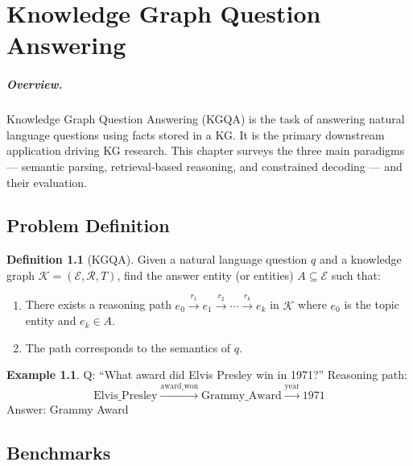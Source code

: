\documentclass[11pt,a4paper,oneside,openany]{book}
\theoremstyle{definition}
\newtheorem{definition}{Definition}[chapter]
\newtheorem{example}{Example}[chapter]
\theoremstyle{plain}
\theoremstyle{remark}
\newcommand{\cE}{\mathcal{E}}
\newcommand{\cR}{\mathcal{R}}
\newcommand{\kg}{\mathcal{K}}
\begin{document}
\chapter{Knowledge Graph Question Answering}\label{ch:kgqa}

\paragraph{Overview.}
Knowledge Graph Question Answering (KGQA) is the task of answering natural language questions using facts stored in a KG. It is the primary downstream application driving KG research. This chapter surveys the three main paradigms --- semantic parsing, retrieval-based reasoning, and constrained decoding --- and their evaluation.

\section{Problem Definition}\label{sec:kgqa-def}

\begin{definition}[KGQA]
	Given a natural language question $q$ and a knowledge graph $\kg = (\cE, \cR, T)$, find the answer entity (or entities) $A \subseteq \cE$ such that:
	\begin{enumerate}
		\item There exists a reasoning path $e_0 \xrightarrow{r_1} e_1 \xrightarrow{r_2} \cdots \xrightarrow{r_k} e_k$ in $\kg$ where $e_0$ is the topic entity and $e_k \in A$.
		\item The path corresponds to the semantics of $q$.
	\end{enumerate}
\end{definition}

\begin{example}
	Q: ``What award did Elvis Presley win in 1971?''
	Reasoning path:
	$$\text{Elvis\_Presley} \xrightarrow{\text{award\_won}} \text{Grammy\_Award} \xrightarrow{\text{year}} 1971$$
	Answer: Grammy Award
\end{example}

\section{Benchmarks}\label{sec:kgqa-bench}
\end{document}
